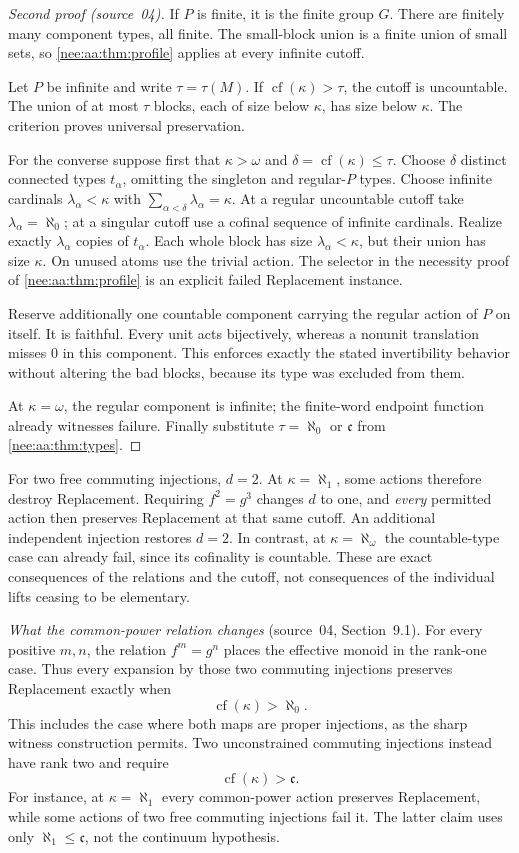 \documentclass[11pt,letterpaper]{article}
\numberwithin{equation}{section}
\theoremstyle{plain}
\theoremstyle{definition}
\theoremstyle{remark}
\newcommand{\cf}{\operatorname{cf}}
\newcommand{\cont}{\mathfrak c}
\begin{document}
\begin{proof}[Second proof (source~04)]
If $P$ is finite, it is the finite group $G$.
There are finitely many component types, all finite.
The small-block union is a finite union of small sets,
so \cref{nee:aa:thm:profile} applies at every infinite cutoff.

Let $P$ be infinite and write $\tau=\tau(M)$.
If $\cf(\kappa)>\tau$, the cutoff is uncountable.
The union of at most $\tau$ blocks, each of size
below $\kappa$, has size below $\kappa$.
The criterion proves universal preservation.

For the converse suppose first that
$\kappa>\omega$ and $\delta=\cf(\kappa)\leq\tau$.
Choose $\delta$ distinct connected types $t_\alpha$,
omitting the singleton and regular-$P$ types.
Choose infinite cardinals $\lambda_\alpha<\kappa$
with $\sum_{\alpha<\delta}\lambda_\alpha=\kappa$.
At a regular uncountable cutoff take
$\lambda_\alpha=\aleph_0$; at a singular cutoff use
a cofinal sequence of infinite cardinals.
Realize exactly $\lambda_\alpha$ copies of $t_\alpha$.
Each whole block has size $\lambda_\alpha<\kappa$,
but their union has size $\kappa$.
On unused atoms use the trivial action.
The selector in the necessity proof of
\cref{nee:aa:thm:profile} is an explicit failed Replacement instance.

Reserve additionally one countable component carrying
the regular action of $P$ on itself. It is faithful.
Every unit acts bijectively, whereas a nonunit translation
misses $0$ in this component. This enforces exactly
the stated invertibility behavior without altering the
bad blocks, because its type was excluded from them.

At $\kappa=\omega$, the regular component is infinite;
the finite-word endpoint function already witnesses
failure. Finally substitute $\tau=\aleph_0$ or
$\cont$ from \cref{nee:aa:thm:types}.
\end{proof}

For two free commuting injections, $d=2$. At $\kappa=\aleph_1$, some actions
therefore destroy Replacement. Requiring $f^2=g^3$ changes $d$ to one, and
\emph{every} permitted action then preserves Replacement at that same cutoff.
An additional independent injection restores $d=2$. In contrast, at
$\kappa=\aleph_\omega$ the countable-type case can already fail, since its
cofinality is countable. These are exact consequences of the relations and
the cutoff, not consequences of the individual lifts ceasing to be elementary.

\emph{What the common-power relation changes} (source~04, Section~9.1).
For every positive $m,n$, the relation $f^m=g^n$
places the effective monoid in the rank-one case.
Thus every expansion by those two commuting injections
preserves Replacement exactly when
\[
\cf(\kappa)>\aleph_0.
\]
This includes the case where both maps are proper
injections, as the sharp witness construction permits.
Two unconstrained commuting injections instead have
rank two and require
\[
\cf(\kappa)>\cont.
\]
For instance, at $\kappa=\aleph_1$ every common-power
action preserves Replacement, while some actions of
two free commuting injections fail it. The latter
claim uses only $\aleph_1\leq\cont$, not the
continuum hypothesis.
\end{document}
